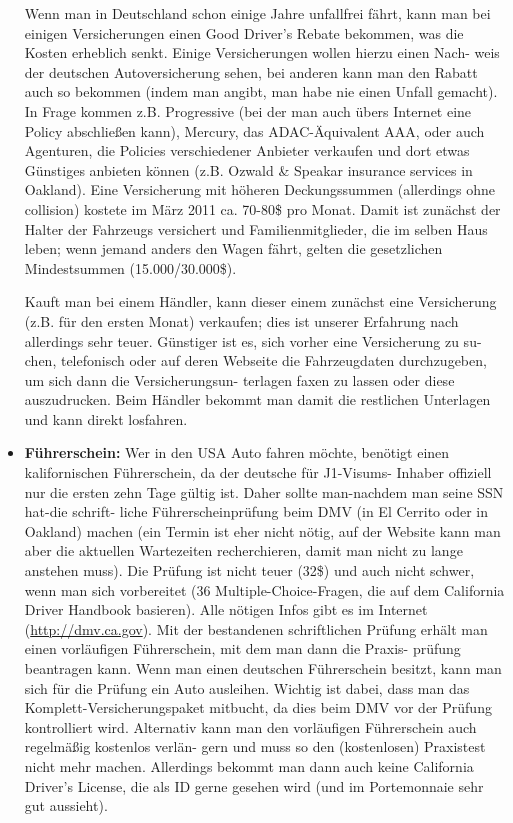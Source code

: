 \documentclass[a4paper]{scrreprt}
\begin{document}
\begin{itemize}
	Wenn man in Deutschland schon einige Jahre unfallfrei fährt, kann man bei einigen Versicherungen einen Good Driver's Rebate bekommen, was die Kosten erheblich senkt. Einige Versicherungen wollen hierzu einen Nach- weis der deutschen Autoversicherung sehen, bei anderen kann man den Rabatt auch so bekommen (indem man angibt, man habe nie einen Unfall gemacht). In Frage kommen z.B. Progressive (bei der man auch übers Internet eine Policy abschließen kann), Mercury, das ADAC-Äquivalent AAA, oder auch Agenturen, die Policies verschiedener Anbieter verkaufen und dort etwas Günstiges anbieten können (z.B. Ozwald \& Speakar insurance services in Oakland). Eine Versicherung mit höheren Deckungssummen (allerdings ohne collision) kostete im März 2011 ca. 70-80\$ pro Monat. Damit ist zunächst der Halter der Fahrzeugs versichert und Familienmitglieder, die im selben Haus leben; wenn jemand anders den Wagen fährt, gelten die gesetzlichen Mindestsummen (15.000/30.000\$).
	
Kauft man bei einem Händler, kann dieser einem zunächst eine Versicherung (z.B. für den ersten Monat) verkaufen; dies ist unserer Erfahrung nach allerdings sehr teuer. Günstiger ist es, sich vorher eine Versicherung zu su- chen, telefonisch oder auf deren Webseite die Fahrzeugdaten durchzugeben, um sich dann die Versicherungsun- terlagen faxen zu lassen oder diese auszudrucken. Beim Händler bekommt man damit die restlichen Unterlagen und kann direkt losfahren.

	\item \textbf{Führerschein:} 
Wer in den USA Auto fahren möchte, benötigt einen kalifornischen Führerschein, da der deutsche für J1-Visums- Inhaber offiziell nur die ersten zehn Tage gültig ist. Daher sollte man-nachdem man seine SSN hat-die schrift- liche Führerscheinprüfung beim DMV (in El Cerrito oder in Oakland) machen (ein Termin ist eher nicht nötig, auf der Website kann man aber die aktuellen Wartezeiten recherchieren, damit man nicht zu lange anstehen muss).
Die Prüfung ist nicht teuer (32\$) und auch nicht schwer, wenn man sich vorbereitet (36 Multiple-Choice-Fragen, die auf dem California Driver Handbook basieren). Alle nötigen Infos gibt es im Internet (\url{http://dmv.ca.gov}). Mit der bestandenen schriftlichen Prüfung erhält man einen vorläufigen Führerschein, mit dem man dann die Praxis- prüfung beantragen kann. Wenn man einen deutschen Führerschein besitzt, kann man sich für die Prüfung ein Auto ausleihen. Wichtig ist dabei, dass man das Komplett-Versicherungspaket mitbucht, da dies beim DMV vor der Prüfung kontrolliert wird. Alternativ kann man den vorläufigen Führerschein auch regelmäßig kostenlos verlän- gern und muss so den (kostenlosen) Praxistest nicht mehr machen. Allerdings bekommt man dann auch keine California Driver's License, die als ID gerne gesehen wird (und im Portemonnaie sehr gut aussieht).


\end{itemize}
\end{document}
